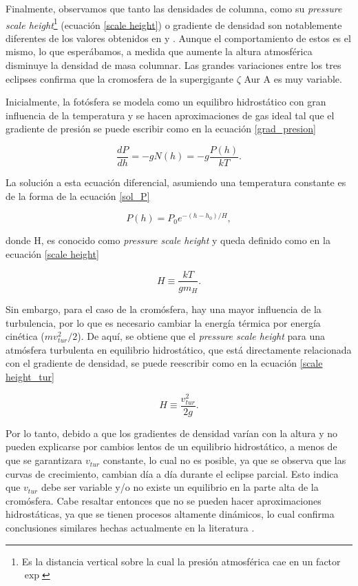 \documentclass[12pt,oneside,openany,letter]{book}
\begin{document}
Finalmente, observamos que tanto las densidades de columna, como su \textit{pressure scale height}\footnote{Es la distancia vertical sobre la cual la presión atmosférica cae en un factor $\exp$} (ecuación \ref{scale height}) o gradiente de densidad son notablemente diferentes de los valores obtenidos en \citep{kps1O} y \citep{wilson1954chromospheric}. Aunque el comportamiento de estos es el mismo, lo que esperábamos, a medida que aumente la altura atmosférica disminuye la densidad de masa columnar. Las grandes variaciones entre los tres eclipses confirma que la cromosfera de la supergigante $\zeta$ Aur A es muy variable.

Inicialmente, la fotósfera se modela como un equilibro hidrostático con gran influencia de la temperatura y se hacen aproximaciones de gas ideal tal que el gradiente de presión se puede escribir como en la ecuación \ref{grad_presion}
 
\begin{equation}
    \frac{d P}{d h}=-g N(h) =  -g \frac{P(h)}{kT}
    \label{grad_presion}.
\end{equation}

La solución a esta ecuación diferencial, asumiendo una temperatura constante es de la forma de la ecuación \ref{sol_P}

\begin{equation}
    P(h) = P_0 e^{-(h-h_0)/H},
    \label{sol_P}
\end{equation}

donde H, es conocido como \textit{pressure scale height} y queda definido como en la ecuación \ref{scale height}

\begin{equation}
    H \equiv \frac{kT}{gm_H}.
    \label{scale height}
\end{equation}

Sin embargo, para el caso de la cromósfera, hay una mayor influencia de la turbulencia, por lo que es necesario cambiar la energía térmica por energía cinética ($mv_{tur}^2/2$). De aquí, se obtiene que el \textit{pressure scale height} para una atmósfera turbulenta en equilibrio hidrostático, que está directamente relacionada con el gradiente de densidad, se puede reescribir como en la ecuación \ref{scale height_tur}

\begin{equation}
    H \equiv \frac{v_{tur}^2}{2g}.
    \label{scale height_tur}
\end{equation}

Por lo tanto, debido a que los gradientes de densidad varían con la altura y no pueden explicarse por cambios lentos de un equilibrio hidrostático, a menos de que se garantizara $v_{tur}$ constante, lo cual no es posible, ya que se observa que las curvas de crecimiento, cambian día a día durante el eclipse parcial. Esto indica que $v_{tur}$ debe ser variable y/o no existe un equilibrio en la parte alta de la cromósfera. Cabe resaltar entonces que no se pueden hacer aproximaciones hidrostáticas, ya que se tienen procesos altamente dinámicos, lo cual confirma conclusiones similares hechas actualmente en la literatura \citep{ayres2019stellar}.
\end{document}
